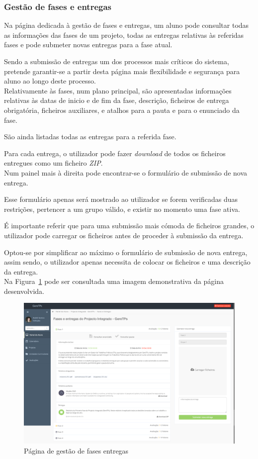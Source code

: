 \subsubsection{Gestão de fases e entregas}
\label{ssub:gestao_fases}

Na página dedicada à gestão de fases e entregas, um aluno pode consultar todas as informações das fases de um projeto, todas as entregas relativas às referidas fases e pode submeter novas entregas para a fase atual.

Sendo a submissão de entregas um dos processos mais críticos do sistema, pretende garantir-se a partir desta página mais flexibilidade e segurança para aluno ao longo deste processo.\\

Relativamente às fases, num plano principal, são apresentadas informações relativas às datas de inicio e de fim da fase, descrição, ficheiros de entrega obrigatória, ficheiros auxiliares, e atalhos para a pauta e para o enunciado da fase.

São ainda listadas todas as entregas para a referida fase.

Para cada entrega, o utilizador pode fazer \textit{download} de todos os ficheiros entregues como um ficheiro \textit{ZIP}.\\

Num painel mais à direita pode encontrar-se o formulário de submissão de nova entrega.

Esse formulário apenas será mostrado ao utilizador se forem verificadas duas restrições, pertencer a um grupo válido, e existir no momento uma fase ativa.

É importante referir que para uma submissão mais cómoda de ficheiros grandes, o utilizador pode carregar os ficheiros antes de proceder à submissão da entrega.

Optou-se por simplificar ao máximo o formulário de submissão de nova entrega, assim sendo, o utilizador apenas necessita de colocar os ficheiros e uma descrição da entrega.\\

Na Figura~\ref{fig:student_deliveries} pode ser consultada uma imagem demonstrativa da página desenvolvida.

\begin{figure}[H]
  \centering
  \includegraphics[width=1\textwidth,center]{images/implementacao/alunos/deliveries}
  \caption{Página de gestão de fases entregas}
  \label{fig:student_deliveries}
\end{figure}

